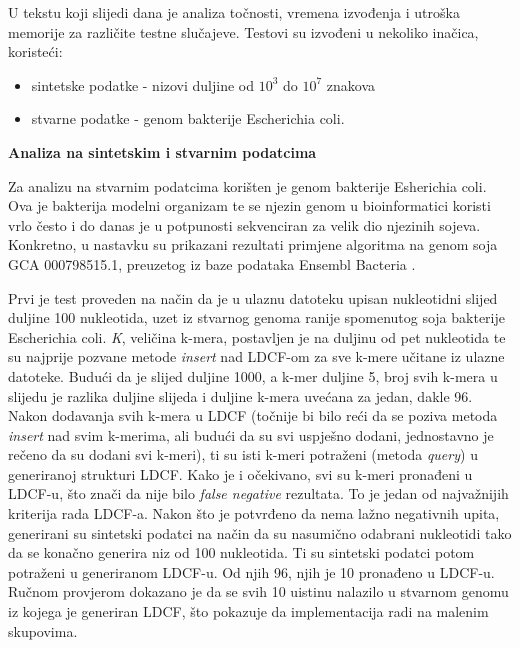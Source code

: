 \documentclass[times, utf8, seminar, numeric]{fer}
\begin{document}
U tekstu koji slijedi dana je analiza točnosti, vremena izvođenja i utroška memorije za različite testne slučajeve. Testovi su izvođeni u nekoliko inačica, koristeći:
\begin{itemize}

  \item {sintetske podatke - nizovi duljine od $10^3$ do $10^7$ znakova}
  \item {stvarne podatke - genom bakterije Escherichia coli.}

\end{itemize}


\begin{flushleft}
\textbf{Analiza na sintetskim i stvarnim podatcima}
\end{flushleft}


Za analizu na stvarnim podatcima korišten je genom bakterije Esherichia coli. Ova je bakterija modelni organizam te se njezin genom u bioinformatici koristi vrlo često i do danas je u potpunosti sekvenciran za velik dio njezinih sojeva.
Konkretno, u nastavku su prikazani rezultati primjene algoritma na genom soja GCA 000798515.1, preuzetog iz baze podataka Ensembl Bacteria \cite{ensembl_bacteria}.


Prvi je test proveden na način da je u ulaznu datoteku upisan nukleotidni slijed duljine 100 nukleotida, uzet iz stvarnog genoma ranije spomenutog soja bakterije Escherichia coli. \textit{K}, veličina k-mera, postavljen je na duljinu od pet nukleotida te su najprije pozvane metode \textit{insert} nad LDCF-om za sve k-mere učitane iz ulazne datoteke. Budući da je slijed duljine 1000, a k-mer duljine 5, broj svih k-mera u slijedu je razlika duljine slijeda i duljine k-mera uvećana za jedan, dakle 96. Nakon dodavanja svih k-mera u LDCF (točnije bi bilo reći da se poziva metoda \textit{insert} nad svim k-merima, ali budući da su svi uspješno dodani, jednostavno je rečeno da su dodani svi k-meri), ti su isti k-meri potraženi (metoda \textit{query}) u generiranoj strukturi LDCF. Kako je i očekivano, svi su k-meri pronađeni u LDCF-u, što znači da nije bilo \textit{false negative} rezultata. To je jedan od najvažnijih kriterija rada LDCF-a. Nakon što je potvrđeno da nema lažno negativnih upita, generirani su sintetski podatci na način da su nasumično odabrani nukleotidi tako da se konačno generira niz od 100 nukleotida. Ti su sintetski podatci potom potraženi u generiranom LDCF-u. Od njih 96, njih je 10 pronađeno u LDCF-u. Ručnom provjerom dokazano je da se svih 10 uistinu nalazilo u stvarnom genomu iz kojega je generiran LDCF, što pokazuje da implementacija radi na malenim skupovima.
\end{document}
